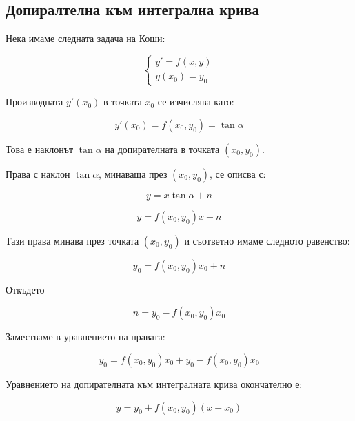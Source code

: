 \documentclass{scrartcl}
\begin{document}
\subsection{Допиралтелна към интегрална крива}

Нека имаме следната задача на Коши:

$$
\begin{cases}
y' = f(x, y)\\
y(x_0) = y_0
\end{cases}
$$

Производната $y'(x_0)$ в точката $x_0$ се изчислява като:  

$$y'(x_0) = f(x_0, y_0) = \tan{\alpha}$$

Това е наклонът $\tan{\alpha}$ на допирателната в точката $(x_0, y_0)$.

Права с наклон $\tan{\alpha}$, минаваща през $(x_0, y_0)$, се описва с:

$$y = x\tan{\alpha} + n$$

$$y = f(x_0, y_0)x + n$$

Тази права минава през точката $(x_0, y_0)$ и съответно имаме следното равенство:

$$y_0 = f(x_0, y_0)x_0 + n$$

Откъдето

$$n = y_0 - f(x_0, y_0)x_0$$

Заместваме в уравнението на правата:

$$y_0 = f(x_0, y_0)x_0 + y_0 - f(x_0, y_0)x_0$$

Уравнението на допирателната към интегралната крива окончателно е:

$$y = y_0 + f(x_0, y_0)(x - x_0)$$
\end{document}
